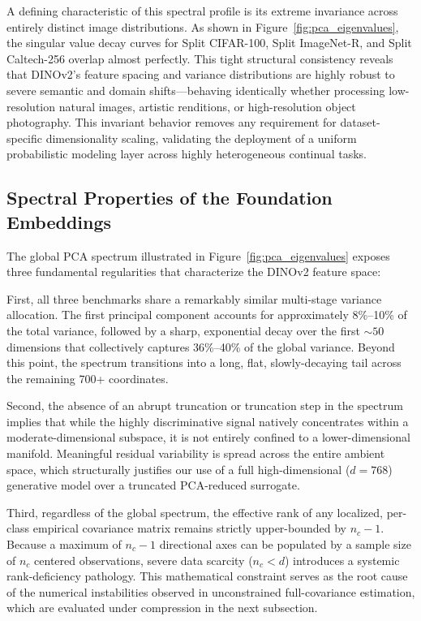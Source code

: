 A defining characteristic of this spectral profile is its extreme invariance across entirely distinct image distributions. As shown in Figure~\ref{fig:pca_eigenvalues}, the singular value decay curves for Split CIFAR-100, Split ImageNet-R, and Split Caltech-256 overlap almost perfectly. This tight structural consistency reveals that DINOv2's feature spacing and variance distributions are highly robust to severe semantic and domain shifts---behaving identically whether processing low-resolution natural images, artistic renditions, or high-resolution object photography. This invariant behavior removes any requirement for dataset-specific dimensionality scaling, validating the deployment of a uniform probabilistic modeling layer across highly heterogeneous continual tasks.

\subsection{Spectral Properties of the Foundation Embeddings}
\label{sec:an:spectrum}

The global PCA spectrum illustrated in Figure~\ref{fig:pca_eigenvalues} exposes three fundamental regularities that characterize the DINOv2 feature space:

First, all three benchmarks share a remarkably similar multi-stage variance allocation. The first principal component accounts for approximately 8\%--10\% of the total variance, followed by a sharp, exponential decay over the first $\sim\!50$ dimensions that collectively captures 36\%--40\% of the global variance. Beyond this point, the spectrum transitions into a long, flat, slowly-decaying tail across the remaining 700+ coordinates. 

Second, the absence of an abrupt truncation or truncation step in the spectrum implies that while the highly discriminative signal natively concentrates within a moderate-dimensional subspace, it is not entirely confined to a lower-dimensional manifold. Meaningful residual variability is spread across the entire ambient space, which structurally justifies our use of a full high-dimensional ($d=768$) generative model over a truncated PCA-reduced surrogate.

Third, regardless of the global spectrum, the effective rank of any localized, per-class empirical covariance matrix remains strictly upper-bounded by $n_c - 1$. Because a maximum of $n_c - 1$ directional axes can be populated by a sample size of $n_c$ centered observations, severe data scarcity ($n_c < d$) introduces a systemic rank-deficiency pathology. This mathematical constraint serves as the root cause of the numerical instabilities observed in unconstrained full-covariance estimation, which are evaluated under compression in the next subsection.

